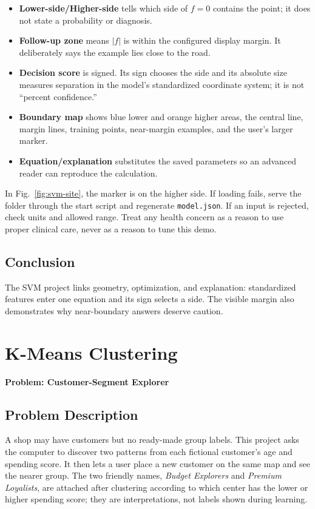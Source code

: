 \documentclass[12pt,a4paper,openany]{report}
\newcommand{\problemname}[1]{%
  \begin{center}
    {\Large\color{blue}\textbf{Problem: #1}}
  \end{center}
  \vspace{0.5em}
}
\begin{document}
\begin{itemize}
  \item \textbf{Lower-side/Higher-side} tells which side of $f=0$ contains the
  point; it does not state a probability or diagnosis.
  \item \textbf{Follow-up zone} means $|f|$ is within the configured display
  margin. It deliberately says the example lies close to the road.
  \item \textbf{Decision score} is signed. Its sign chooses the side and its
  absolute size measures separation in the model's standardized coordinate
  system; it is not ``percent confidence.''
  \item \textbf{Boundary map} shows blue lower and orange higher areas, the
  central line, margin lines, training points, near-margin examples, and the
  user's larger marker.
  \item \textbf{Equation/explanation} substitutes the saved parameters so an
  advanced reader can reproduce the calculation.
\end{itemize}
In Fig.~\ref{fig:svm-site}, the marker is on the higher side. If loading fails,
serve the folder through the start script and regenerate \texttt{model.json}.
If an input is rejected, check units and allowed range. Treat any health concern
as a reason to use proper clinical care, never as a reason to tune this demo.

\section{Conclusion}
The SVM project links geometry, optimization, and explanation: standardized
features enter one equation and its sign selects a side. The visible margin
also demonstrates why near-boundary answers deserve caution.

\chapter{K-Means Clustering}
\problemname{Customer-Segment Explorer}

\section{Problem Description}
A shop may have customers but no ready-made group labels. This project asks the
computer to discover two patterns from each fictional customer's age and
spending score. It then lets a user place a new customer on the same map and
see the nearer group. The two friendly names, \textit{Budget Explorers} and
\textit{Premium Loyalists}, are attached after clustering according to which
center has the lower or higher spending score; they are interpretations, not
labels shown during learning.
\end{document}
